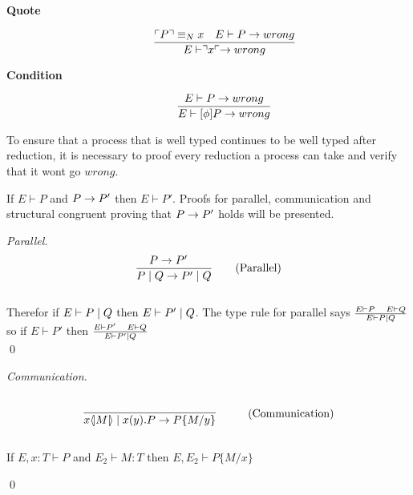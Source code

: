 \begin{description}
    \item[\textbf{Quote}]\begin{align*}
        \frac{\ulcorner P \urcorner \equiv _N x \quad E \vdash P \rightarrow wrong}{E \vdash \urcorner x \ulcorner \rightarrow wrong}
    \end{align*}

    \item[\textbf{Condition}]\begin{align*}
        \frac{E \vdash P \rightarrow wrong}{E \vdash [\phi]P \rightarrow wrong}
    \end{align*}
\end{description}



\begin{theorem}
    To ensure that a process that is well typed continues to be well typed after reduction, it is necessary to proof every reduction a process can take and verify that it wont go \ensuremath{wrong}.

    If \ensuremath{E \vdash P} and \ensuremath{P\ra P'} then \ensuremath{E \vdash P'}.
    Proofs for parallel, communication and structural congruent proving that \ensuremath{P \ra P'} holds will be presented.\\

    \begin{proof}[Parallel]
        \begin{align*}
            \frac{P \rightarrow P' \quad}{P \mid Q \rightarrow P' \mid Q} \tag{Parallel}
        \end{align*}\\

    Therefor if \ensuremath{E \vdash P \para Q} then \ensuremath{E \vdash P' \para Q}. The type rule for parallel says \ensuremath{\frac{E \vdash P\quad E \vdash Q}{E \vdash P \para Q}} so if \ensuremath{E \vdash P'} then \ensuremath{\frac{E \vdash P' \quad E \vdash Q}{E \vdash P' \para Q}}\\
        \qed
    \end{proof}

    \begin{proof}[Communication]
        \begin{align*}
            \infrule{}{\lift{x}{M}\para\inp{x}{y}P\ra P\{M/y\}} \tag{Communication}
        \end{align*}

        \begin{lemma}[Substitution]
            If \ensuremath{E,x:T \vdash P} and \ensuremath{E_2 \vdash M:T} then \ensuremath{E, E_2 \vdash P\{M/x \}}
        \end{lemma}
        \qed
    \end{proof}


\end{theorem}
